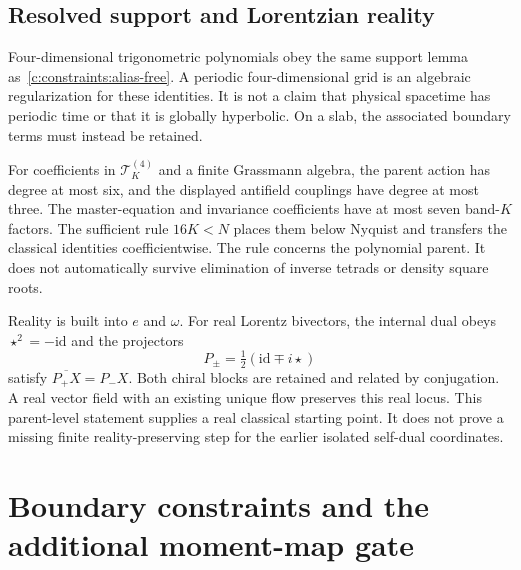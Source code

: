 \subsection{Resolved support and Lorentzian reality}
Four-dimensional trigonometric polynomials obey the same support lemma as~\eqref{c:constraints:alias-free}. A periodic four-dimensional grid is an algebraic regularization for these identities. It is not a claim that physical spacetime has periodic time or that it is globally hyperbolic. On a slab, the associated boundary terms must instead be retained.

For coefficients in $\mathcal T_K^{(4)}$ and a finite Grassmann algebra, the parent action has degree at most six, and the displayed antifield couplings have degree at most three. The master-equation and invariance coefficients have at most seven band-$K$ factors. The sufficient rule $16K<N$ places them below Nyquist and transfers the classical identities coefficientwise. The rule concerns the polynomial parent. It does not automatically survive elimination of inverse tetrads or density square roots.

Reality is built into $e$ and $\omega$. For real Lorentz bivectors, the internal dual obeys $\star^2=-\mathrm{id}$ and the projectors
\begin{equation}
 P_\pm=\tfrac12(\mathrm{id}\mp i\star)
\end{equation}
satisfy $\overline{P_+X}=P_-X$. Both chiral blocks are retained and related by conjugation. A real vector field with an existing unique flow preserves this real locus. This parent-level statement supplies a real classical starting point. It does not prove a missing finite reality-preserving step for the earlier isolated self-dual coordinates.

\section{Boundary constraints and the additional moment-map gate}
\label{c:constraints:boundary}

